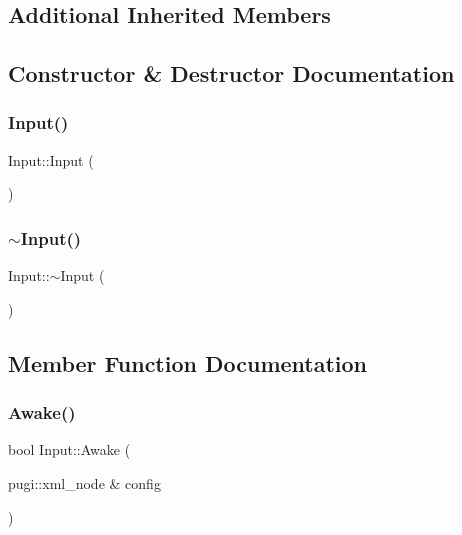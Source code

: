 \subsection*{Additional Inherited Members}


\subsection{Constructor \& Destructor Documentation}
\mbox{\label{class_input_abae3f379d3f157cf42dc857309832dba}} 
\subsubsection{\texorpdfstring{Input()}{Input()}}
{\footnotesize\ttfamily Input\+::\+Input (\begin{DoxyParamCaption}{ }\end{DoxyParamCaption})}

\mbox{\label{class_input_af2db35ba67c8a8ccd23bef6a482fc291}} 
\subsubsection{\texorpdfstring{$\sim$Input()}{~Input()}}
{\footnotesize\ttfamily Input\+::$\sim$\+Input (\begin{DoxyParamCaption}{ }\end{DoxyParamCaption})\hspace{0.3cm}{\ttfamily [virtual]}}



\subsection{Member Function Documentation}
\mbox{\label{class_input_a9876d33805a73bbb895eb453f5c492ec}} 
\subsubsection{\texorpdfstring{Awake()}{Awake()}}
{\footnotesize\ttfamily bool Input\+::\+Awake (\begin{DoxyParamCaption}\item[{pugi\+::xml\+\_\+node \&}]{config }\end{DoxyParamCaption})\hspace{0.3cm}{\ttfamily [virtual]}}



